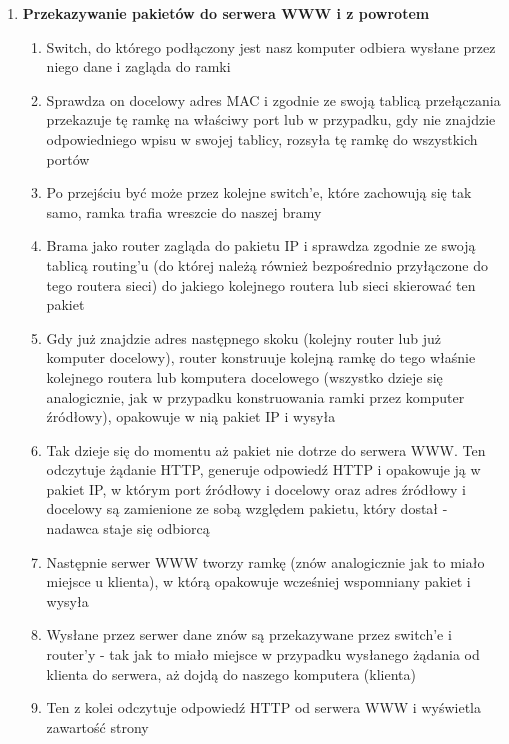 \documentclass[main.tex]{subfiles}
\begin{document}
\begin{enumerate}
        \item \textbf{Przekazywanie pakietów do serwera WWW i z powrotem}
        \begin{enumerate}
            \item Switch, do którego podłączony jest nasz komputer odbiera wysłane przez niego dane i zagląda do ramki
            \item Sprawdza on docelowy adres MAC i zgodnie ze swoją tablicą przełączania przekazuje tę ramkę na właściwy port
            lub w przypadku, gdy nie znajdzie odpowiedniego wpisu w swojej tablicy, rozsyła tę ramkę do wszystkich portów
            \item Po przejściu być może przez kolejne switch'e, które zachowują się tak samo, ramka trafia wreszcie do naszej bramy
            \item Brama jako router zagląda do pakietu IP i sprawdza zgodnie ze swoją tablicą routing'u
            (do której należą również bezpośrednio przyłączone do tego routera sieci) do jakiego kolejnego routera lub sieci skierować ten pakiet
            \item Gdy już znajdzie adres następnego skoku (kolejny router lub już komputer docelowy), router konstruuje kolejną ramkę do tego właśnie kolejnego routera
            lub komputera docelowego (wszystko dzieje się analogicznie, jak w przypadku konstruowania ramki przez komputer źródłowy), opakowuje w nią pakiet IP i wysyła
            \item Tak dzieje się do momentu aż pakiet nie dotrze do serwera WWW. Ten odczytuje żądanie HTTP, generuje odpowiedź HTTP i opakowuje ją w pakiet IP,
            w którym port źródłowy i docelowy oraz adres źródłowy i docelowy są zamienione ze sobą względem pakietu, który dostał - nadawca staje się odbiorcą
            \item Następnie serwer WWW tworzy ramkę (znów analogicznie jak to miało miejsce u klienta), w którą opakowuje wcześniej wspomniany pakiet i wysyła
            \item Wysłane przez serwer dane znów są przekazywane przez switch'e i router'y - tak jak to miało miejsce w przypadku wysłanego żądania od klienta do serwera,
            aż dojdą do naszego komputera (klienta)
            \item Ten z kolei odczytuje odpowiedź HTTP od serwera WWW i wyświetla zawartość strony
        \end{enumerate}
    \end{enumerate}
    \newpage
\end{document}
